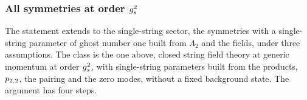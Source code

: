 \subsubsection{All symmetries at order \texorpdfstring{$g_s^2$}{gs2}}
\label{sec:gauge-bv:all-symmetries}


The statement extends to the single-string sector, the symmetries with a single-string parameter of ghost number one built from $\Lambda_2$ and the fields, under three assumptions.
The class is the one above, closed string field theory at generic momentum at order $g_s^2$, with single-string parameters built from the products, $p_{2,2}$, the pairing and the zero modes, without a fixed background state.
The argument has four steps.
